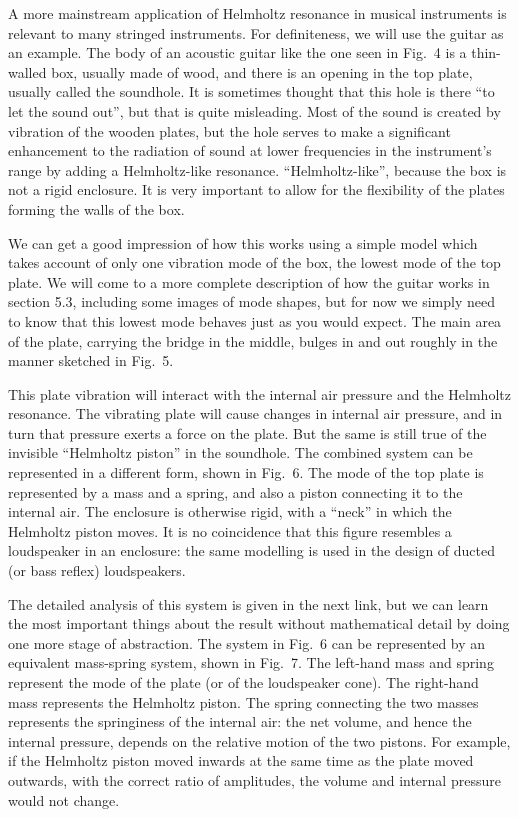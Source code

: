   A more mainstream application of Helmholtz resonance in musical instruments 
  is relevant to many stringed instruments. For definiteness, we will use the 
  guitar as an example. The body of an acoustic guitar like the one seen in 
  Fig.\ 4 is a thin-walled box, usually made of wood, and there is an opening 
  in the top plate, usually called the soundhole. It is sometimes thought that 
  this hole is there ``to let the sound out'', but that is quite misleading. 
  Most of the sound is created by vibration of the wooden plates, but the hole 
  serves to make a significant enhancement to the radiation of sound at lower 
  frequencies in the instrument's range by adding a Helmholtz-like resonance. 
  ``Helmholtz-like'', because the box is not a rigid enclosure. It is very 
  important to allow for the flexibility of the plates forming the walls of the 
  box. 

  We can get a good impression of how this works using a simple model which 
  takes account of only one vibration mode of the box, the lowest mode of the 
  top plate. We will come to a more complete description of how the guitar 
  works in section 5.3, including some images of mode shapes, but for now we 
  simply need to know that this lowest mode behaves just as you would expect. 
  The main area of the plate, carrying the bridge in the middle, bulges in and 
  out roughly in the manner sketched in Fig.\ 5. 

  This plate vibration will interact with the internal air pressure and the 
  Helmholtz resonance. The vibrating plate will cause changes in internal air 
  pressure, and in turn that pressure exerts a force on the plate. But the same 
  is still true of the invisible ``Helmholtz piston'' in the soundhole. The 
  combined system can be represented in a different form, shown in Fig.\ 6. The 
  mode of the top plate is represented by a mass and a spring, and also a 
  piston connecting it to the internal air. The enclosure is otherwise rigid, 
  with a ``neck'' in which the Helmholtz piston moves. It is no coincidence 
  that this figure resembles a loudspeaker in an enclosure: the same modelling 
  is used in the design of ducted (or bass reflex) loudspeakers. 

  The detailed analysis of this system is given in the next link, but we can 
  learn the most important things about the result without mathematical detail 
  by doing one more stage of abstraction. The system in Fig.\ 6 can be 
  represented by an equivalent mass-spring system, shown in Fig.\ 7. The 
  left-hand mass and spring represent the mode of the plate (or of the 
  loudspeaker cone). The right-hand mass represents the Helmholtz piston. The 
  spring connecting the two masses represents the springiness of the internal 
  air: the net volume, and hence the internal pressure, depends on the relative 
  motion of the two pistons. For example, if the Helmholtz piston moved inwards 
  at the same time as the plate moved outwards, with the correct ratio of 
  amplitudes, the volume and internal pressure would not change. 


